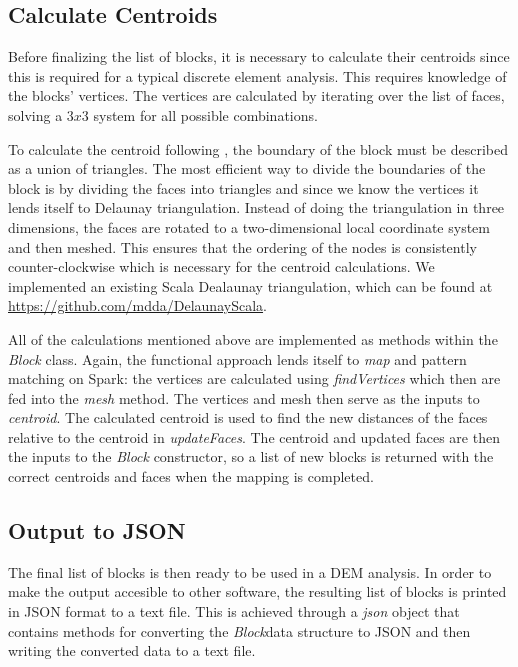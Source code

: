 \subsection{Calculate Centroids}
Before finalizing the list of blocks, it is necessary to calculate their centroids since this is required for a typical discrete element analysis. This requires knowledge of the blocks' vertices. The vertices are calculated by iterating over the list of faces, solving a $3x3$ system for all possible combinations. 

To calculate the centroid following \cite{centroid}, the boundary of the block must be described as a union of triangles. The most efficient way to divide the boundaries of the block is by dividing the faces into triangles and since we know the vertices it lends itself to Delaunay triangulation. Instead of doing the triangulation in three dimensions, the faces are rotated to a two-dimensional local coordinate system and then meshed. This ensures that the ordering of the nodes is consistently counter-clockwise which is necessary for the centroid calculations. We implemented an existing Scala Dealaunay triangulation, which can be found at \url{https://github.com/mdda/DelaunayScala}.

All of the calculations mentioned above are implemented as methods within the \textit{Block} class. Again, the functional approach lends itself to \textit{map} and pattern matching on Spark: the vertices are calculated using \textit{findVertices} which then are fed into the \textit{mesh} method. The vertices and mesh then serve as the inputs to \textit{centroid}. The calculated centroid is used to find the new distances of the faces relative to the centroid in \textit{updateFaces}. The centroid and updated faces are then the inputs to the \textit{Block} constructor, so a list of new blocks is returned with the correct centroids and faces when the mapping is completed.

\subsection{Output to JSON}
The final list of blocks is then ready to be used in a DEM analysis. In order to make the output accesible to other software, the resulting list of blocks is printed in JSON format to a text file. This is achieved through a \textit{json} object that contains methods for converting the \textit{Block}data structure to JSON and then writing the converted data to a text file. 
